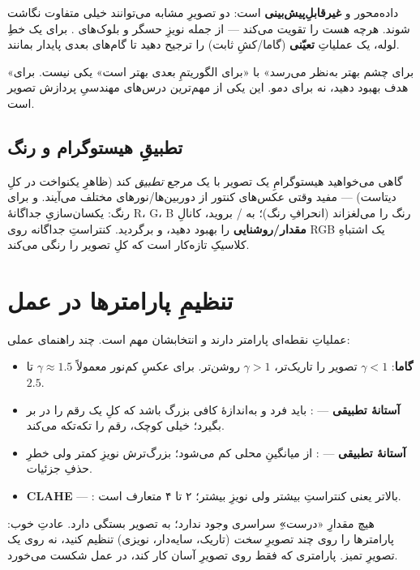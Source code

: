 \documentclass[12pt,a4paper]{article}
\begin{document}
داده‌محور و \textbf{غیرقابلِ‌پیش‌بینی} است: دو تصویرِ مشابه می‌توانند خیلی متفاوت نگاشت شوند. هرچه
هست را تقویت می‌کند — از جمله نویزِ حسگر و بلوک‌های . برای یک خطِ لوله، یک عملیاتِ
\textbf{تعیّنی} (گاما/کشِ ثابت) را ترجیح دهید تا گام‌های بعدی پایدار بمانند.

\begin{nokte}
«برای چشم بهتر به‌نظر می‌رسد» با «برای الگوریتمِ بعدی بهتر است» یکی نیست. برای هدف بهبود دهید، نه
برای دمو. این یکی از مهم‌ترین درس‌های مهندسیِ پردازش تصویر است.
\end{nokte}

\subsection{تطبیقِ هیستوگرام و رنگ}

گاهی می‌خواهید هیستوگرامِ یک تصویر با یک مرجع \emph{تطبیق} کند (ظاهرِ یکنواخت در کلِ دیتاست) —
مفید وقتی عکس‌های کنتور از دوربین‌ها/نورهای مختلف می‌آیند. و برای رنگ: یکسان‌سازیِ جداگانهٔ R، G،
B رنگ را می‌لغزاند (انحرافِ رنگ)؛ به / بروید، کانالِ \textbf{مقدار/روشنایی} را
بهبود دهید، و برگردید. کنتراستِ جداگانه روی RGB یک اشتباهِ کلاسیکِ تازه‌کار است که کلِ تصویر را
رنگی می‌کند.

\section{تنظیمِ پارامترها در عمل}

عملیاتِ نقطه‌ای پارامتر دارند و انتخابشان مهم است. چند راهنمای عملی:

\begin{itemize}
  \item \textbf{گاما}: $\gamma < 1$ تصویر را تاریک‌تر، $\gamma > 1$ روشن‌تر. برای عکسِ کم‌نور معمولاً $\gamma \approx 1.5$ تا $2.5$.
  \item \textbf{آستانهٔ تطبیقی} — : باید فرد و به‌اندازهٔ کافی بزرگ باشد که کلِ یک رقم را در بر بگیرد؛ خیلی کوچک، رقم را تکه‌تکه می‌کند.
  \item \textbf{آستانهٔ تطبیقی} — : از میانگینِ محلی کم می‌شود؛ بزرگ‌ترش نویزِ کمتر ولی خطرِ حذفِ جزئیات.
  \item \textbf{CLAHE} — : بالاتر یعنی کنتراستِ بیشتر ولی نویزِ بیشتر؛ ۲ تا ۴ متعارف است.
\end{itemize}

\begin{nokte}
هیچ مقدارِ «درست»ِ سراسری وجود ندارد؛ به تصویر بستگی دارد. عادتِ خوب: پارامترها را روی چند
تصویرِ \emph{سخت} (تاریک، سایه‌دار، نویزی) تنظیم کنید، نه روی یک تصویرِ تمیز. پارامتری که فقط روی
تصویرِ آسان کار کند، در عمل شکست می‌خورد.
\end{nokte}
\end{document}
